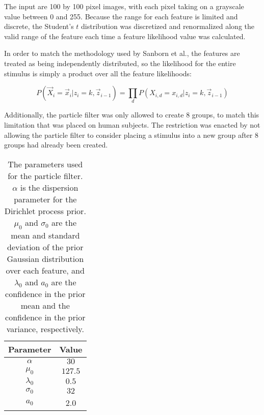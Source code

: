 The input are 100 by 100 pixel images, with each pixel taking on a grayscale
value between 0 and 255. Because the range for each feature is limited and
discrete, the Student's $t$ distribution was discretized and renormalized along
the valid range of the feature each time a feature likelihood value was
calculated.

In order to match the methodology used by Sanborn et al., the features are
treated as being independently distributed, so the likelihood for the entire
stimulus is simply a product over all the feature likelihoods:

\begin{equation}
P(\vec{X}_i = \vec{x}_i | z_i = k,  \vec{z}_{i-1}) =  \prod_d P(X_{i,d} =
x_{i,d} | z_i = k,  \vec{z}_{i-1})
\end{equation}

Additionally, the particle filter was only allowed to create 8 groups, to match
this limitation that was placed on human subjects.  The restriction was enacted
by not allowing the particle filter to consider placing a stimulus into a new
group after 8 groups had already been created.

\begin{table}
\centering
\begin{tabular}{c | c}
Parameter & Value \\ \hline
$\alpha$ & $30$ \\
$\mu_0$ & $127.5$ \\
$\lambda_0$ & $0.5$ \\
$\sigma_0$ & $32$ \\
$a_0$ & 2.0 \\
\end{tabular}
\caption{The parameters used for the particle filter. $\alpha$ is the dispersion
parameter for the Dirichlet process prior. $\mu_0$ and $\sigma_0$ are the mean
and standard deviation of the prior Gaussian distribution over each feature, and
$\lambda_0$ and $a_0$ are the confidence in the prior mean and the confidence in the
prior variance, respectively.}
\label{tab:parameters}
\end{table}

